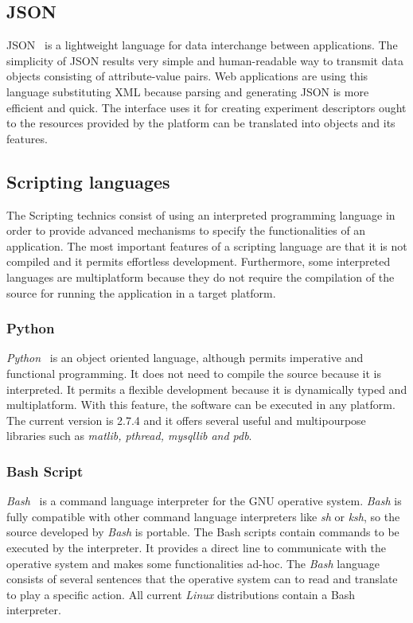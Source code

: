 \subsection{JSON}

\ac{JSON}~\cite{Organization} is a lightweight language for data interchange between applications. The
simplicity of \ac{JSON} results very simple and human-readable way to transmit data
objects consisting of attribute-value pairs. Web applications are using this
language substituting \ac{XML} because parsing and generating \ac{JSON} is more efficient
and quick. The \bonfire interface uses it for creating experiment descriptors
ought to the resources provided by the platform can be translated into objects
and its features.

\subsection{Scripting languages}

The Scripting technics consist of using an interpreted programming language in
order to provide advanced mechanisms to specify the functionalities of an
application. The most important features of a scripting language are that it is not
compiled and it permits effortless development. Furthermore, some interpreted languages
are multiplatform because they do not require the compilation of the source for
running the application in a target platform. 


\subsubsection{Python}
\emph{Python}~\cite{Foundation2014} is an object oriented language, although permits imperative and functional
programming. It does not need to compile the source because it is
interpreted. It permits a flexible development because it is dynamically typed
and multiplatform. With this feature, the software can be
executed in any platform. The current version is 2.7.4 and it offers several
useful and multipourpose libraries such as \emph{matlib, pthread, mysqllib and pdb}.

\subsubsection{Bash Script}

\emph{Bash}~\cite{Cooper2014} is a command language interpreter for the \ac{GNU}
operative system. \emph{Bash} is fully compatible with other command language
interpreters like \emph{sh} or \emph{ksh}, so the source developed by
\emph{Bash} is portable. The Bash scripts contain
commands  to be executed by the interpreter. It provides a direct line
to communicate with the operative system and makes some functionalities ad-hoc.
The \emph{Bash} language consists of several sentences that the operative system
can to read and translate to play a specific action. All current \emph{Linux} distributions contain a Bash interpreter. 


